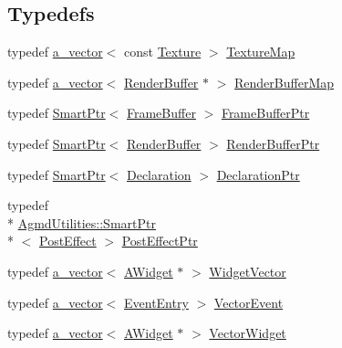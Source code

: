 \subsection*{Typedefs}
\begin{DoxyCompactItemize}
\item 
typedef \hyperlink{_vector_8h_a3df82cea60ff4ad0acb44e58454406a5}{a\+\_\+vector}$<$ const \hyperlink{class_agmd_1_1_texture}{Texture} $>$ \hyperlink{namespace_agmd_aee41a562679bc3f0f62073c46a692c4c}{Texture\+Map}
\item 
typedef \hyperlink{_vector_8h_a3df82cea60ff4ad0acb44e58454406a5}{a\+\_\+vector}$<$ \hyperlink{class_agmd_1_1_render_buffer}{Render\+Buffer} $\ast$ $>$ \hyperlink{namespace_agmd_a6e9a7cfb1414faf52f6290cf604872a9}{Render\+Buffer\+Map}
\item 
typedef \hyperlink{class_agmd_utilities_1_1_smart_ptr}{Smart\+Ptr}$<$ \hyperlink{class_agmd_1_1_frame_buffer}{Frame\+Buffer} $>$ \hyperlink{namespace_agmd_a6a2089580a8bf36738ed6935796b515d}{Frame\+Buffer\+Ptr}
\item 
typedef \hyperlink{class_agmd_utilities_1_1_smart_ptr}{Smart\+Ptr}$<$ \hyperlink{class_agmd_1_1_render_buffer}{Render\+Buffer} $>$ \hyperlink{namespace_agmd_a5369c7994075d92fc9a7ed9039ec0ece}{Render\+Buffer\+Ptr}
\item 
typedef \hyperlink{class_agmd_utilities_1_1_smart_ptr}{Smart\+Ptr}$<$ \hyperlink{class_agmd_1_1_declaration}{Declaration} $>$ \hyperlink{namespace_agmd_a7784897efe9624596f7980eef99ace59}{Declaration\+Ptr}
\item 
typedef \\*
\hyperlink{class_agmd_utilities_1_1_smart_ptr}{Agmd\+Utilities\+::\+Smart\+Ptr}\\*
$<$ \hyperlink{class_agmd_1_1_post_effect}{Post\+Effect} $>$ \hyperlink{namespace_agmd_aded2fb07d1a048d839c8ffeeb56de7cb}{Post\+Effect\+Ptr}
\item 
typedef \hyperlink{_vector_8h_a3df82cea60ff4ad0acb44e58454406a5}{a\+\_\+vector}$<$ \hyperlink{class_agmd_1_1_a_widget}{A\+Widget} $\ast$ $>$ \hyperlink{namespace_agmd_aef7baa69b34272786cd1f8690ca0071e}{Widget\+Vector}
\item 
typedef \hyperlink{_vector_8h_a3df82cea60ff4ad0acb44e58454406a5}{a\+\_\+vector}$<$ \hyperlink{struct_agmd_1_1_event_entry}{Event\+Entry} $>$ \hyperlink{namespace_agmd_a58e024c1af9bb8a40910c507a4602953}{Vector\+Event}
\item 
typedef \hyperlink{_vector_8h_a3df82cea60ff4ad0acb44e58454406a5}{a\+\_\+vector}$<$ \hyperlink{class_agmd_1_1_a_widget}{A\+Widget} $\ast$ $>$ \hyperlink{namespace_agmd_a390261fa9cd4571caab83e2d7a34020c}{Vector\+Widget}

\end{DoxyCompactItemize}
